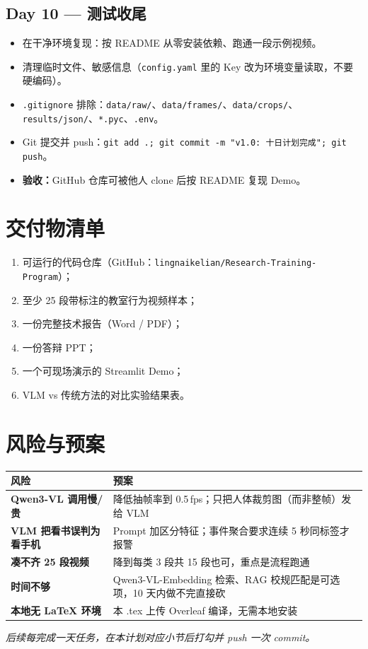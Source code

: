 \documentclass[12pt,a4paper]{ctexart}
\begin{document}
\subsection*{Day 10 — 测试收尾}
\begin{itemize}
  \item 在干净环境复现：按 README 从零安装依赖、跑通一段示例视频。
  \item 清理临时文件、敏感信息（\texttt{config.yaml} 里的 Key 改为环境变量读取，不要硬编码）。
  \item \texttt{.gitignore} 排除：\texttt{data/raw/}、\texttt{data/frames/}、\texttt{data/crops/}、
        \texttt{results/json/}、\texttt{*.pyc}、\texttt{.env}。
  \item Git 提交并 push：\texttt{git add .; git commit -m "v1.0: 十日计划完成"; git push}。
  \item \textbf{验收：}GitHub 仓库可被他人 clone 后按 README 复现 Demo。
\end{itemize}

\section{交付物清单}

\begin{enumerate}
  \item 可运行的代码仓库（GitHub：\texttt{lingnaikelian/Research-Training-Program}）；
  \item 至少 25 段带标注的教室行为视频样本；
  \item 一份完整技术报告（Word / PDF）；
  \item 一份答辩 PPT；
  \item 一个可现场演示的 Streamlit Demo；
  \item VLM vs 传统方法的对比实验结果表。
\end{enumerate}

\section{风险与预案}

\begin{table}[h]
\centering
\begin{tabular}{>{\bfseries}p{4cm} p{10cm}}
\toprule
风险 & 预案 \\
\midrule
Qwen3-VL 调用慢/贵 & 降低抽帧率到 0.5\,fps；只把人体裁剪图（而非整帧）发给 VLM \\
VLM 把看书误判为看手机 & Prompt 加区分特征；事件聚合要求连续 5 秒同标签才报警 \\
凑不齐 25 段视频 & 降到每类 3 段共 15 段也可，重点是流程跑通 \\
时间不够 & Qwen3-VL-Embedding 检索、RAG 校规匹配是可选项，10 天内做不完直接砍 \\
本地无 LaTeX 环境 & 本 .tex 上传 Overleaf 编译，无需本地安装 \\
\bottomrule
\end{tabular}
\end{table}

\vspace{1cm}
\noindent\textit{后续每完成一天任务，在本计划对应小节后打勾并 push 一次 commit。}
\end{document}
